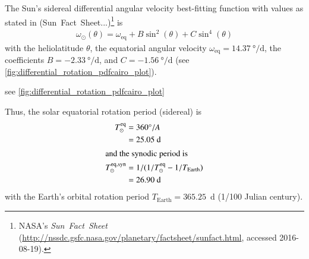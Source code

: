 The Sun's sidereal differential angular velocity best-fitting function with values as stated in (Sun~Fact~Sheet...)\footnote{NASA's \textit{Sun~Fact~Sheet} (\url{http://nssdc.gsfc.nasa.gov/planetary/factsheet/sunfact.html}, accessed 2016-08-19).} is
\begin{align}
	\omega_\odot(\theta) = \omega_\text{eq} + B \sin^2(\theta) + C \sin^4(\theta)	\label{eq:omega_differential}
\end{align}
with the heliolatitude $\theta$, the equatorial angular velocity $\omega_\text{eq} = \SI{14.37}{\degree\per\day}$, the coefficients $B = \SI{-2.33}{\degree\per\day}$, and $C = \SI{-1.56}{\degree\per\day}$ (see \autoref{fig:differential_rotation_pdfcairo_plot}).

see \autoref{fig:differential_rotation_pdfcairo_plot}
\begin{figure}[htb]
\end{figure}

\noindent Thus, the solar equatorial rotation period (sidereal) is
\begin{align}
	T_\odot^\text{eq} &= 360\degree / A\\
	&= 25.05~\text{d}	\nonumber\\
\shortintertext{and the synodic period is}
	T_\odot^\text{eq,syn} &= 1/(1/T_\odot^\text{eq} - 1/T_\text{Earth})\\
	&= 26.90~\text{d}	\nonumber
\end{align}
with the Earth's orbital rotation period $T_\text{Earth} = 365.25$~d (1/100 Julian century).\\

